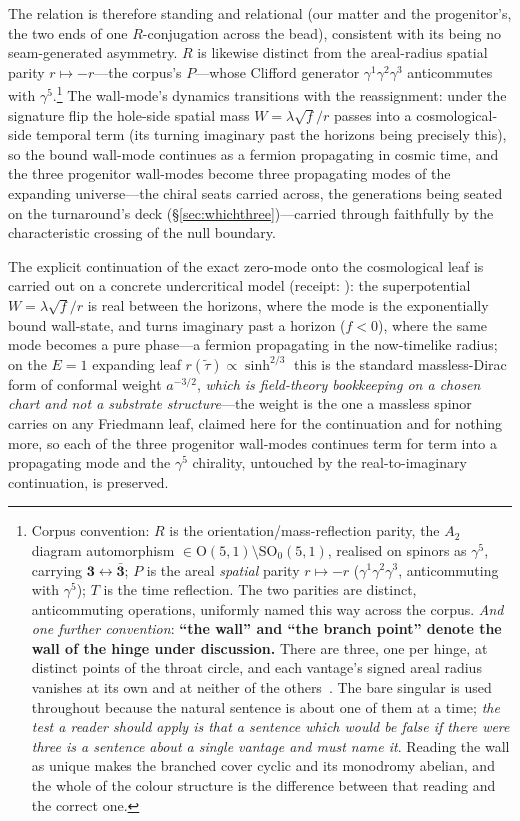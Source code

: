 \documentclass[11pt]{article}
\begin{document}
The relation is therefore standing and relational (our matter and the progenitor's, the two ends of one $R$-conjugation across the bead), consistent with its being no seam-generated asymmetry. $R$ is likewise distinct from the areal-radius spatial parity $r\mapsto-r$---the corpus's $P$---whose Clifford generator $\gamma^1\gamma^2\gamma^3$ anticommutes with $\gamma^5$.\footnote{Corpus convention: $R$ is the orientation/mass-reflection parity, the $A_2$ diagram automorphism $\in\mathrm{O}(5,1)\setminus\mathrm{SO}_0(5,1)$, realised on spinors as $\gamma^5$, carrying $\mathbf 3\leftrightarrow\bar{\mathbf 3}$; $P$ is the areal \emph{spatial} parity $r\mapsto-r$ ($\gamma^1\gamma^2\gamma^3$, anticommuting with $\gamma^5$); $T$ is the time reflection. The two parities are distinct, anticommuting operations, uniformly named this way across the corpus. \emph{And one further convention}: \textbf{``the wall'' and ``the branch point'' denote the wall of the hinge under discussion.} There are three, one per hinge, at distinct points of the throat circle, and each vantage's signed areal radius vanishes at its own and at neither of the others~\cite{JanzenSlicing}. The bare singular is used throughout because the natural sentence is about one of them at a time; \emph{the test a reader should apply is that a sentence which would be false if there were three is a sentence about a single vantage and must name it}. Reading the wall as unique makes the branched cover cyclic and its monodromy abelian, and the whole of the colour structure is the difference between that reading and the correct one.} The wall-mode's dynamics transitions with the reassignment: under the signature flip the hole-side spatial mass $W=\lambda\sqrt f/r$ passes into a cosmological-side temporal term (its turning imaginary past the horizons being precisely this), so the bound wall-mode continues as a fermion propagating in cosmic time, and the three progenitor wall-modes become three propagating modes of the expanding universe---the chiral seats carried across, the generations being seated on the turnaround's deck (\S\ref{sec:whichthree})---carried through faithfully by the characteristic crossing of the null boundary. 

The explicit continuation of the exact zero-mode onto the cosmological leaf is carried out on a concrete undercritical model (receipt: ): the superpotential $W=\lambda\sqrt f/r$ is real between the horizons, where the mode is the exponentially bound wall-state, and turns imaginary past a horizon ($f<0$), where the same mode becomes a pure phase---a fermion propagating in the now-timelike radius; on the $E=1$ expanding leaf $r(\tilde\tau)\propto\sinh^{2/3}$ this is the standard massless-Dirac form of conformal weight $a^{-3/2}$, \emph{which is field-theory bookkeeping on a chosen chart and not a substrate structure}---the weight is the one a massless spinor carries on any Friedmann leaf, claimed here for the continuation and for nothing more, so each of the three progenitor wall-modes continues term for term into a propagating mode and the $\gamma^5$ chirality, untouched by the real-to-imaginary continuation, is preserved. 
\end{document}
